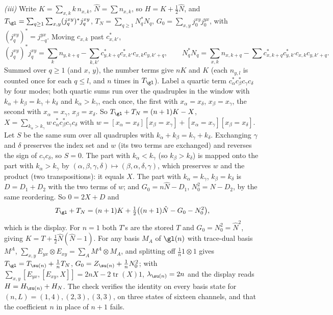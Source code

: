 \emph{(iii)} Write $K = \sum_{x,k}k\,n_{x,k}$, $\hat N = \sum n_{x,k}$, so $H = K + \tfrac12\hat N$, and $T_{\gl} = \sum_{q \ge 1}\sum_{x,y}(j^{xy}_{q})^{*}j^{xy}_{q}$, $T_{N} = \sum_{q \ge 1}N_{q}^{*}N_{q}$, $G_{0} = \sum_{x,y}j^{xy}_{0}j^{yx}_{0}$, with $(j^{xy}_{q})^{*} = j^{yx}_{-q}$. Moving $c_{x,k}$ past $c^{*}_{x,k'}$,
\[
(j^{xy}_{q})^{*}j^{xy}_{q} = \sum_{k}n_{y,k+q} - \sum_{k,k'}c^{*}_{y,k+q}c^{*}_{x,k'}c_{x,k}c_{y,k'+q}, \qquad N_{q}^{*}N_{q} = \sum_{x,k}n_{x,k+q} - \sum c^{*}_{x,k+q}c^{*}_{y,k'}c_{x,k}c_{y,k'+q} .
\]
Summed over $q \ge 1$ (and $x$, $y$), the number terms give $nK$ and $K$ (each $n_{y,l}$ is counted once for each $q \le l$, and $n$ times in $T_{\gl}$). Label a quartic term $c^{*}_{\alpha}c^{*}_{\beta}c_{\gamma}c_{\delta}$ by four modes; both quartic sums run over the quadruples in the window with $k_{\alpha} + k_{\beta} = k_{\gamma} + k_{\delta}$ and $k_{\alpha} > k_{\gamma}$, each once, the first with $x_{\alpha} = x_{\delta}$, $x_{\beta} = x_{\gamma}$, the second with $x_{\alpha} = x_{\gamma}$, $x_{\beta} = x_{\delta}$. So $T_{\gl} + T_{N} = (n + 1)K - X$, $X = \sum_{k_{\alpha} > k_{\gamma}}w\,c^{*}_{\alpha}c^{*}_{\beta}c_{\gamma}c_{\delta}$ with $w = [x_{\alpha} = x_{\delta}][x_{\beta} = x_{\gamma}] + [x_{\alpha} = x_{\gamma}][x_{\beta} = x_{\delta}]$. Let $S$ be the same sum over all quadruples with $k_{\alpha} + k_{\beta} = k_{\gamma} + k_{\delta}$. Exchanging $\gamma$ and $\delta$ preserves the index set and $w$ (its two terms are exchanged) and reverses the sign of $c_{\gamma}c_{\delta}$, so $S = 0$. The part with $k_{\alpha} < k_{\gamma}$ (so $k_{\beta} > k_{\delta}$) is mapped onto the part with $k_{\alpha} > k_{\gamma}$ by $(\alpha, \beta, \gamma, \delta) \mapsto (\beta, \alpha, \delta, \gamma)$, which preserves $w$ and the product (two transpositions): it equals $X$. The part with $k_{\alpha} = k_{\gamma}$, $k_{\beta} = k_{\delta}$ is $D = D_{1} + D_{2}$ with the two terms of $w$; and $G_{0} = n\hat N - D_{1}$, $N_{0}^{2} = \hat N - D_{2}$, by the same reordering. So $0 = 2X + D$ and
\[
T_{\gl} + T_{N} = (n + 1)K + \tfrac12\bigl((n + 1)\hat N - G_{0} - N_{0}^{2}\bigr),
\]
which is the display. For $n = 1$ both $T$'s are the stored $T$ and $G_{0} = N_{0}^{2} = \hat N^{2}$, giving $K = T + \tfrac12\hat N(\hat N - 1)$. For any basis $M_{A}$ of $\gl(n)$ with trace-dual basis $M^{A}$, $\sum_{x,y}E_{yx}\otimes E_{xy} = \sum_{A}M^{A}\otimes M_{A}$, and splitting off $\tfrac1n 1\otimes 1$ gives $T_{\gl} = T_{\su(n)} + \tfrac1n T_{N}$, $G_{0} = Z_{\su(n)} + \tfrac1n N_{0}^{2}$; with $\sum_{x,y}[E_{yx}, [E_{xy}, X]] = 2nX - 2\operatorname{tr}(X)1$, $\lambda_{\su(n)} = 2n$ and the display reads $H = H_{\su(n)} + H_{N}$. The check verifies the identity on every basis state for $(n, L) = (1, 4), (2, 3), (3, 3)$, on three states of sixteen channels, and that the coefficient $n$ in place of $n + 1$ fails.

